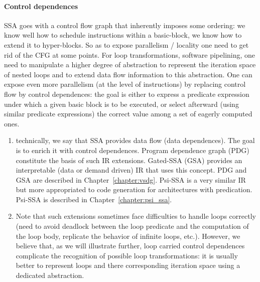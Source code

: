 \paragraph{Control dependences}
SSA goes with a control flow graph that inherently imposes some ordering: we know well how to schedule instructions within a basic-block, we know how to extend it to hyper-blocks. So as to expose parallelism / locality one need to get rid of the CFG at some points. For loop transformations, software pipelining, one need  to manipulate a higher degree of abstraction to represent the iteration space of nested loops and to extend data flow information to this abstraction. One can expose even more parallelism (at the level of instructions) by replacing control flow by control dependences: the goal is either to express a predicate expression under which a given basic block is to be executed, or select afterward (using similar predicate expressions) the correct value among a set of eagerly computed ones.
\begin{enumerate}
\item technically, we say that SSA provides data flow (data dependences). The goal is to enrich it with control dependences. Program dependence graph (PDG) constitute the basis of such IR extensions. Gated-SSA (GSA) provides an interpretable (data or demand driven) IR that uses this concept. PDG and GSA are described in Chapter~\ref{chapter:vsdg}. Psi-SSA is a very similar IR but more appropriated to code generation for architectures with predication. Psi-SSA is described in Chapter~\ref{chapter:psi_ssa}.
\item Note that such extensions sometimes face difficulties to handle loops correctly (need to avoid deadlock between the loop predicate and the computation of the loop body, replicate the behavior of infinite loops, etc.). However, we believe that, as we will illustrate further, loop carried control dependences complicate the recognition of possible loop transformations: it is usually better to represent loops and there corresponding iteration space using a dedicated abstraction. 
\end{enumerate}

